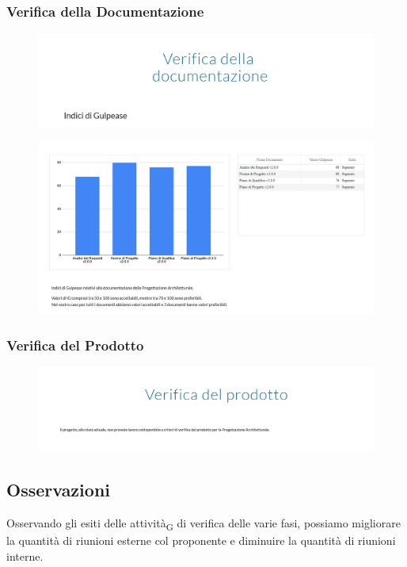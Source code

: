 \subsubsection{Verifica della Documentazione}
\begin{figure}[H]
	\includegraphics[scale=0.5]{res/images/cruscotto/pa_8.png}
\end{figure}
\begin{figure}[H]
	\includegraphics[scale=0.5]{res/images/cruscotto/pa_9.png}
\end{figure}
\subsubsection{Verifica del Prodotto}
\begin{figure}[H]
	\includegraphics[scale=0.5]{res/images/cruscotto/pa_10.png}
\end{figure}
\pagebreak
\subsection{Osservazioni}
Osservando gli esiti delle attività\textsubscript{G} di verifica delle varie fasi, possiamo migliorare la quantità di riunioni esterne col proponente e diminuire la quantità di riunioni interne.
